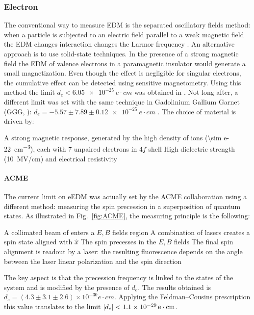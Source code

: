 \begin{refsection}
        \subsubsection{Electron}
            The conventional way to measure EDM is the separated oscillatory fields method: when a particle is subjected to an electric field parallel to a weak magnetic field the EDM changes interaction changes the Larmor frequency \cite{ramsey}.
            An alternative approach is to use solid-state techniques.
            In the presence of a strong magnetic field the EDM of valence electrons in a paramagnetic insulator would generate a small magnetization.
            Even though the effect is negligible for singular electrons, the cumulative effect can be detected using sensitive magnetometry.
            Using this method the limit $d_e<\SI{6.05e-25}{e\cdot cm}$ was obtained in  \cite{eEDM:EuBaTiO}.
            Not long after, a different limit was set with the same technique in  Gadolinium Gallium Garnet (GGG, ): $d_e=-5.57\pm7.89\pm\SI{0.12e-25}{e\cdot cm}$ \cite{eEDM:GGG}.
            The choice of material is driven by:
            \begin{outline}
                \1 A strong magnetic response, generated by the high density of  ions (\SI{\sim e-22}{cm^{-3}}), each with 7 unpaired electrons in $4f$ shell
                \1 High dielectric strength (\SI{10}{MV/cm}) and electrical resistivity
            \end{outline}
            
            \paragraph{ACME}
            The current limit on eEDM was actually set by the ACME collaboration \cite{eEDM:ACME} using a different method: measuring the spin precession in a superposition of quantum states.
            As illustrated in Fig.~\ref{fig:ACME}, the measuring principle is the following:
            \begin{outline}
                \1 A collimated beam of  enters a $E,B$ fields region
                \1 A combination of lasers creates a spin state aligned with $\hat{x}$
                \1 The spin precesses in the $E,B$ fields
                \1 The final spin alignment is readout by a laser: the resulting fluorescence depends on the angle between the laser linear polarization and the spin direction 
            \end{outline}
            The key aspect is that the precession frequency is linked to the states of the system and is modified by the presence of $d_e$.
            The results obtained is $d_e=(4.3\pm3.1\pm2.6)\times 10^{-30}\si{e\cdot cm}$.
            Applying the Feldman–Cousins prescription this value translates to the  limit $\abs{d_e}<\SI{1.1e-29}{e\cdot cm}$.


\end{refsection}
